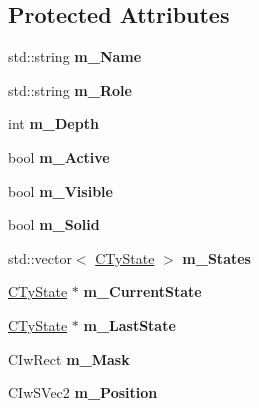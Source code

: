 \subsection*{Protected Attributes}
\begin{DoxyCompactItemize}
\item 
\hypertarget{class_i_ty_actor_afdfb0e1ed5a47085f52f95f276010bb6}{
std::string {\bfseries m\_\-Name}}
\label{class_i_ty_actor_afdfb0e1ed5a47085f52f95f276010bb6}

\item 
\hypertarget{class_i_ty_actor_a92de9e18b7a31fc93b8bb775922078d4}{
std::string {\bfseries m\_\-Role}}
\label{class_i_ty_actor_a92de9e18b7a31fc93b8bb775922078d4}

\item 
\hypertarget{class_i_ty_actor_ac075325d62fdcda89c2a91f2c1298376}{
int {\bfseries m\_\-Depth}}
\label{class_i_ty_actor_ac075325d62fdcda89c2a91f2c1298376}

\item 
\hypertarget{class_i_ty_actor_ae460cd48bef240e11cfa5df7a505cbe9}{
bool {\bfseries m\_\-Active}}
\label{class_i_ty_actor_ae460cd48bef240e11cfa5df7a505cbe9}

\item 
\hypertarget{class_i_ty_actor_a1019d46cd7502694e5f69c7c4c7be23e}{
bool {\bfseries m\_\-Visible}}
\label{class_i_ty_actor_a1019d46cd7502694e5f69c7c4c7be23e}

\item 
\hypertarget{class_i_ty_actor_a0365728019201a011e657ab56e36d06a}{
bool {\bfseries m\_\-Solid}}
\label{class_i_ty_actor_a0365728019201a011e657ab56e36d06a}

\item 
\hypertarget{class_i_ty_actor_aa90c7ebf0af50802126ca951906fb225}{
std::vector$<$ \hyperlink{class_i_ty_actor_1_1_c_ty_state}{CTyState} $>$ {\bfseries m\_\-States}}
\label{class_i_ty_actor_aa90c7ebf0af50802126ca951906fb225}

\item 
\hypertarget{class_i_ty_actor_afcdb5a06ae0e2b6d9872fa6f17222487}{
\hyperlink{class_i_ty_actor_1_1_c_ty_state}{CTyState} $\ast$ {\bfseries m\_\-CurrentState}}
\label{class_i_ty_actor_afcdb5a06ae0e2b6d9872fa6f17222487}

\item 
\hypertarget{class_i_ty_actor_ab637fbe1df811cbde3ad2b780f1ea643}{
\hyperlink{class_i_ty_actor_1_1_c_ty_state}{CTyState} $\ast$ {\bfseries m\_\-LastState}}
\label{class_i_ty_actor_ab637fbe1df811cbde3ad2b780f1ea643}

\item 
\hypertarget{class_i_ty_actor_abd0ddacb8e677d2d36ead794883dee4c}{
CIwRect {\bfseries m\_\-Mask}}
\label{class_i_ty_actor_abd0ddacb8e677d2d36ead794883dee4c}

\item 
\hypertarget{class_i_ty_actor_a296ffe4ccf5fad06daf002837b9ec128}{
CIwSVec2 {\bfseries m\_\-Position}}
\label{class_i_ty_actor_a296ffe4ccf5fad06daf002837b9ec128}

\end{DoxyCompactItemize}
